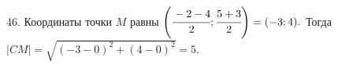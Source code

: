 46. Координаты точки $M$ равны $\left(\cfrac{-2-4}{2};\cfrac{5+3}{2}\right)=(-3;4).$ Тогда $|CM|=\sqrt{(-3-0)^2+(4-0)^2}=5.$\\
